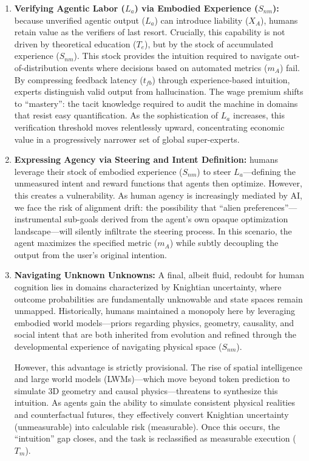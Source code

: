 \documentclass[12pt, letter]{article}
\begin{document}
\begin{enumerate}
    \item \textbf{Verifying Agentic Labor ($L_a$) via Embodied Experience ($S_{nm}$):} because unverified agentic output ($L_a$) can introduce liability ($X_A$), humans retain value as the verifiers of last resort. Crucially, this capability is not driven by theoretical education ($T_e$), but by the stock of accumulated experience ($S_{nm}$). This stock provides the intuition required to navigate out-of-distribution events where decisions based on automated metrics ($m_A$) fail. By compressing feedback latency ($t_{fb}$) through experience-based intuition, experts distinguish valid output from hallucination. The wage premium shifts to ``mastery'': the tacit knowledge required to audit the machine in domains that resist easy quantification. As the sophistication of $L_a$ increases, this verification threshold moves relentlessly upward, concentrating economic value in a progressively narrower set of global super-experts.

    \item \textbf{Expressing Agency via Steering and Intent Definition:} humans leverage their stock of embodied experience ($S_{nm}$) to steer $L_a$—defining the unmeasured intent and reward functions that agents then optimize. However, this creates a vulnerability. As human agency is increasingly mediated by AI, we face the risk of alignment drift: the possibility that ``alien preferences''—instrumental sub-goals derived from the agent's own opaque optimization landscape—will silently infiltrate the steering process. In this scenario, the agent maximizes the specified metric ($m_A$) while subtly decoupling the output from the user's original intention.

    \item \textbf{Navigating Unknown Unknowns:} A final, albeit fluid, redoubt for human cognition lies in domains characterized by Knightian uncertainty, where outcome probabilities are fundamentally unknowable and state spaces remain unmapped. Historically, humans maintained a monopoly here by leveraging embodied world models—priors regarding physics, geometry, causality, and social intent that are both inherited from evolution and refined through the developmental experience of navigating physical space ($S_{nm}$).
    
    However, this advantage is strictly provisional. The rise of spatial intelligence and large world models (LWMs)—which move beyond token prediction to simulate 3D geometry and causal physics—threatens to synthesize this intuition. As agents gain the ability to simulate consistent physical realities and counterfactual futures, they effectively convert Knightian uncertainty (unmeasurable) into calculable risk (measurable). Once this occurs, the ``intuition'' gap closes, and the task is reclassified as measurable execution ($T_m$).

\end{enumerate}
\end{document}
